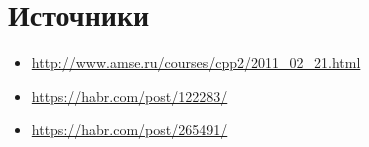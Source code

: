 \documentclass {article}
\begin{document}
\section{Источники}
\begin{itemize}
\item \url{http://www.amse.ru/courses/cpp2/2011_02_21.html}
\item \url{https://habr.com/post/122283/}
\item \url{https://habr.com/post/265491/}
\end{itemize}
\newpage
\tableofcontents
\end{document}
